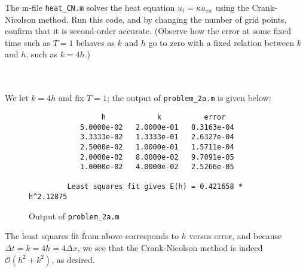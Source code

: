 The m-file \texttt{heat\_CN.m} solves the heat equation $u_t = \kappa u_{xx}$ using the Crank-Nicolson method. Run this
code, and by changing the number of grid points, confirm that it is second-order accurate. (Observe how the error at
some fixed time such as $T = 1$ behaves as $k$ and $h$ go to zero with a fixed relation between $k$ and $h$, such as
$k = 4h$.)

\begin{solution}\ \\\\
    We let $k = 4h$ and fix $T = 1$; the output of \texttt{problem\_2a.m} is given below:

    \begin{figure}[h]
        \centering
        \begin{verbatim}
                 h            k          error
            5.0000e-02   2.0000e-01   8.3163e-04
            3.3333e-02   1.3333e-01   2.6327e-04
            2.5000e-02   1.0000e-01   1.5711e-04
            2.0000e-02   8.0000e-02   9.7091e-05
            1.0000e-02   4.0000e-02   2.5266e-05
          
         Least squares fit gives E(h) = 0.421658 * h^2.12875
        \end{verbatim}
        \caption{Output of \texttt{problem\_2a.m}}
    \end{figure}

    The least squares fit from above corresponds to $h$ versus error, and because \linebreak
    $\Delta t = k = 4h = 4 \Delta x$, we see that the Crank-Nicolson method is indeed \linebreak
    $\mathcal{O}\left(h^2 + k^2\right)$, as desired.
    \ \\
\end{solution}